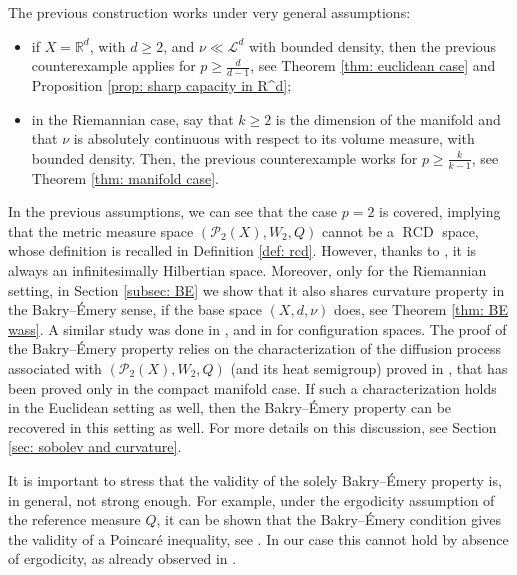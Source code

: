 \documentclass[10pt,leqno]{amsart}
\numberwithin{equation}{section}
\newcommand{\R}{\mathbb{R}}
\newcommand{\PP}{\mathcal{P}}
\begin{document}
The previous construction works under very general assumptions:
\begin{itemize}
    \item if $X = \R^d$, with $d\geq 2$, and $\nu \ll \mathcal{L}^d$ with bounded density, then the previous counterexample applies for $p\geq \frac{d}{d-1}$, see Theorem \ref{thm: euclidean case} and Proposition \ref{prop: sharp capacity in R^d};
    \item in the Riemannian case, say that $k\geq 2$ is the dimension of the manifold and that $\nu$ is absolutely continuous with respect to its volume measure, with bounded density. Then, the previous counterexample works for $p\geq \frac{k}{k-1}$, see Theorem \ref{thm: manifold case}.
\end{itemize}

In the previous assumptions, we can see that the case $p=2$ is covered, implying that the metric measure space $(\PP_2(X),W_2,Q)$ cannot be a $\operatorname{RCD}$ space, whose definition is recalled in Definition \ref{def: rcd}. However, thanks to \cite{fornasier2023density}, it is always an infinitesimally Hilbertian space. Moreover, only for the Riemannian setting, in Section \ref{subsec: BE} we show that it also shares curvature property in the Bakry--\'Emery sense, if the base space $(X,d,\nu)$ does, see Theorem \ref{thm: BE wass}. A similar study was done in \cite{schiavo2023wasserstein}, and in \cite{schiavo2021configuration, schiavo2022configuration} for configuration spaces. The proof of the Bakry--\'Emery property relies on the characterization of the diffusion process associated with $(\PP_2(X),W_2,Q)$ (and its heat semigroup) proved in \cite{delloschiavo2024massive}, that has been proved only in the compact manifold case. If such a characterization holds in the Euclidean setting as well, then the Bakry--\'Emery property can be recovered in this setting as well. For more details on this discussion, see Section \ref{sec: sobolev and curvature}.

It is important to stress that the validity of the solely Bakry--\'Emery property is, in general, not strong enough. For example, under the ergodicity assumption of the reference measure $Q$, it can be shown that the Bakry--\'Emery condition gives the validity of a Poincar\'e inequality, see \cite{bakry2013analysis, chafai2024logarithmic}. In our case this cannot hold by absence of ergodicity, as already observed in \cite[Theorem 1.4]{delloschiavo2024massive}.
\end{document}

